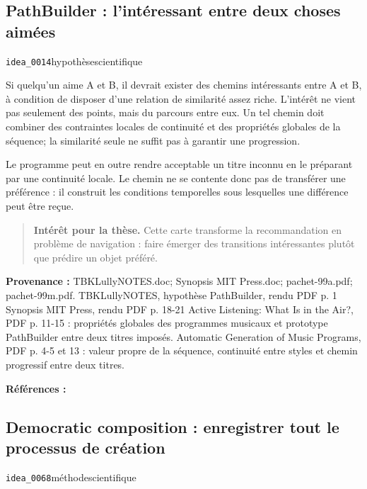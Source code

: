 \documentclass[10pt,a4paper]{article}
\begin{document}
\subsection{PathBuilder : l'intéressant entre deux choses aimées}
{\small\color{metadata} \texttt{idea\_0014}\quad\textbullet\quad hypothèse\quad\textbullet\quad scientifique\par}

Si quelqu'un aime A et B, il devrait exister des chemins intéressants entre A et B, à condition de disposer d'une relation de similarité assez riche. L'intérêt ne vient pas seulement des points, mais du parcours entre eux. Un tel chemin doit combiner des contraintes locales de continuité et des propriétés globales de la séquence; la similarité seule ne suffit pas à garantir une progression.

Le programme peut en outre rendre acceptable un titre inconnu en le préparant par une continuité locale. Le chemin ne se contente donc pas de transférer une préférence : il construit les conditions temporelles sous lesquelles une différence peut être reçue.

\begin{quote}
\textbf{Intérêt pour la thèse.} Cette carte transforme la recommandation en problème de navigation : faire émerger des transitions intéressantes plutôt que prédire un objet préféré.
\end{quote}
{\footnotesize\color{metadata}\textbf{Provenance :} TBKLullyNOTES.doc; Synopsis MIT Press.doc; pachet-99a.pdf; pachet-99m.pdf. TBKLullyNOTES, hypothèse PathBuilder, rendu PDF p. 1 Synopsis MIT Press, rendu PDF p. 18-21 Active Listening: What Is in the Air?, PDF p. 11-15 : propriétés globales des programmes musicaux et prototype PathBuilder entre deux titres imposés. Automatic Generation of Music Programs, PDF p. 4-5 et 13 : valeur propre de la séquence, continuité entre styles et chemin progressif entre deux titres.\par}
{\footnotesize\color{metadata}\textbf{Références :} \parencite{pachet1999active,pachet1999programs}\par}

\subsection{Democratic composition : enregistrer tout le processus de création}
{\small\color{metadata} \texttt{idea\_0068}\quad\textbullet\quad méthode\quad\textbullet\quad scientifique\par}
\end{document}
